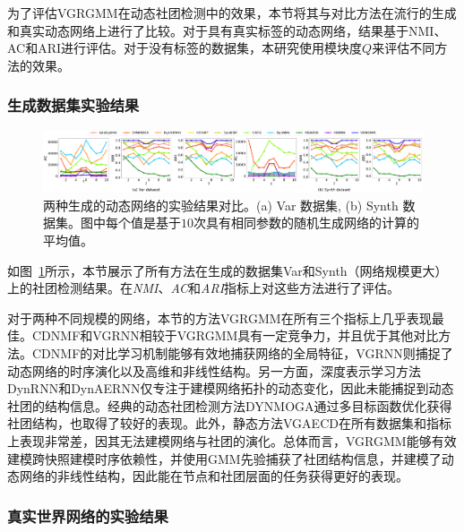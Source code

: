 为了评估VGRGMM在动态社团检测中的效果，本节将其与对比方法在流行的生成和真实动态网络上进行了比较。对于具有真实标签的动态网络，结果基于NMI、AC和ARI进行评估。对于没有标签的数据集，本研究使用模块度$Q$来评估不同方法的效果。



\subsubsection{生成数据集实验结果}

\begin{figure}[htbp]
    \centering
    \hspace{-2mm}
    \includegraphics[width=1\textwidth]{figures/chap06/chap5synthData.pdf}
    \caption{两种生成的动态网络的实验结果对比。(a) Var 数据集, (b) Synth 数据集。图中每个值是基于$10$次具有相同参数的随机生成网络的计算的平均值。}
    \label{fig:gene}
\end{figure}

如图~\ref{fig:gene}所示，本节展示了所有方法在生成的数据集Var和Synth（网络规模更大）上的社团检测结果。在\emph{NMI}、\emph{AC}和\emph{ARI}指标上对这些方法进行了评估。

对于两种不同规模的网络，本节的方法VGRGMM在所有三个指标上几乎表现最佳。CDNMF和VGRNN相较于VGRGMM具有一定竞争力，并且优于其他对比方法。CDNMF的对比学习机制能够有效地捕获网络的全局特征，VGRNN则捕捉了动态网络的时序演化以及高维和非线性结构。另一方面，深度表示学习方法DynRNN和DynAERNN仅专注于建模网络拓扑的动态变化，因此未能捕捉到动态社团的结构信息。经典的动态社团检测方法DYNMOGA通过多目标函数优化获得社团结构，也取得了较好的表现。此外，静态方法VGAECD在所有数据集和指标上表现非常差，因其无法建模网络与社团的演化。总体而言，VGRGMM能够有效建模跨快照建模时序依赖性，并使用GMM先验捕获了社团结构信息，并建模了动态网络的非线性结构，因此能在节点和社团层面的任务获得更好的表现。



\subsubsection{真实世界网络的实验结果}


